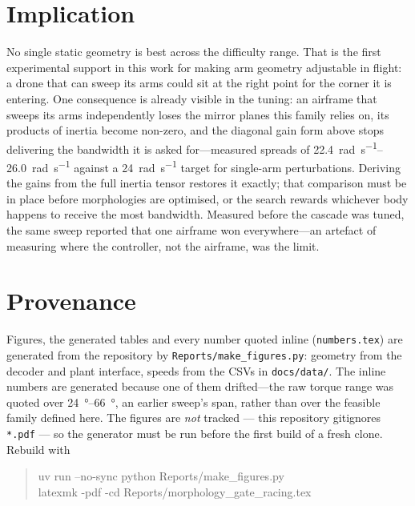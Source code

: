 \documentclass[11pt,a4paper]{article}
\begin{document}
\section{Implication}

No single static geometry is best across the difficulty range. That is the first
experimental support in this work for making arm geometry adjustable in flight:
a drone that can sweep its arms could sit at the right point for the corner it is
entering. One consequence is already visible in the tuning: an airframe that
sweeps its arms independently loses the mirror planes this family relies on,
its products of inertia become non-zero, and the diagonal gain form above stops
delivering the bandwidth it is asked for---measured spreads of
\SIrange{22.4}{26.0}{\radian\per\second} against a \SI{24}{\radian\per\second}
target for single-arm perturbations. Deriving the gains from the full inertia
tensor restores it exactly; that comparison must be in place before morphologies
are optimised, or the search rewards whichever body happens to receive the most
bandwidth. Measured before the cascade was tuned, the same sweep reported that one
airframe won everywhere---an artefact of measuring where the controller, not the
airframe, was the limit.

\section*{Provenance}

Figures, the generated tables and every number quoted inline
(\texttt{numbers.tex}) are generated from the repository by
\texttt{Reports/make\_figures.py}: geometry from the decoder and plant interface,
speeds from the CSVs in \texttt{docs/data/}. The inline numbers are generated
because one of them drifted---the raw torque range was quoted over
\SIrange{24}{66}{\degree}, an earlier sweep's span, rather than over the
feasible family defined here. The figures are \emph{not} tracked
--- this repository gitignores \texttt{*.pdf} --- so the generator must be run
before the first build of a fresh clone. Rebuild with

\begin{quote}\ttfamily\small
uv run --no-sync python Reports/make\_figures.py \\
latexmk -pdf -cd Reports/morphology\_gate\_racing.tex
\end{quote}
\end{document}
